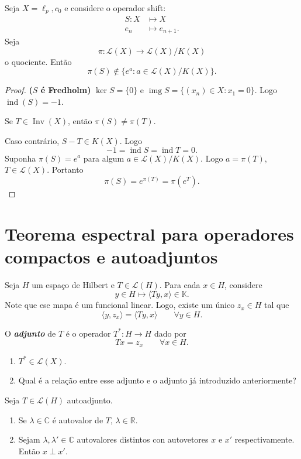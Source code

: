 \documentclass[portuguese]{article}
\theoremstyle{definition}
\newcommand{\R}{\mathbb{R}}
\newcommand{\C}{\mathbb{C}}
\DeclareMathOperator{\img}{img}
\begin{document}
\begin{coro}
	Seja $X=\ell_p,c_0$ e considere o operador shift:
	\begin{align*}
		S:X&\mapsto X\\
		e_n&\mapsto e_{n+1}.
	\end{align*}
	Seja
	\[\pi:\mathcal{L}(X)\to \mathcal{L}(X)/K(X)\]
	o quociente. Então
	\[\pi(S)\notin\{e^a:a\in\mathcal{L}(X)/K(X)\}.\]
\end{coro}
\begin{proof}
	\textbf{($S$ é Fredholm)} $\ker S=\{0\}$ e $\img S=\{(x_n)\in X:x_1=0\}$.
	Logo $\operatorname{ind}(S)=-1$.
	\begin{af}
		Se $T\in\operatorname{Inv}(X)$, então $\pi(S)\neq\pi(T)$.
	\end{af}
	Caso contrário, $S-T\in K(X)$. Logo
	\[-1=\operatorname{ind}S=\operatorname{ind}T=0.\]
	Suponha $\pi(S)=e^a$ para algum $a\in\mathcal{L}(X)/K(X)$. Logo $a=\pi(T)$, $T\in\mathcal{L}(X)$. Portanto
	\[\pi(S)=e^{\pi(T)}=\pi(e^T).\]
\end{proof}

\section{Teorema espectral para operadores compactos e autoadjuntos}
Seja $H$ um espaço de Hilbert e $T\in\mathcal{L}(H)$. Para cada $x\in H$, considere
\[y\in H\mapsto \langle Ty,x\rangle\in\mathbb{K}.\]
Note que ese mapa é um funcional linear. Logo, existe um único $z_x\in H$ tal que
\[\langle y,z_x\rangle=\langle Ty,x\rangle\qquad\forall y\in H.\]

\begin{defn}
	O \textbf{\textit{adjunto}} de $T$ é o operador $T^*:H\to H$ dado por
	\[Tx=z_x\qquad\forall x\in H.\]
\end{defn}
\begin{exer*}\leavevmode
	\begin{enumerate}
		\item $T^*\in\mathcal{L}(X)$.
		\item Qual é a relação entre esse adjunto e o adjunto já introduzido anteriormente?
	\end{enumerate}
\end{exer*}

\begin{prop}
	Seja $T\in\mathcal{L}(H)$ autoadjunto.
	\begin{enumerate}
		\item Se $\lambda\in\C$ é autovalor de $T$, $\lambda\in\R$.
		\item Sejam $\lambda, \lambda'\in\C$ autovalores distintos con autovetores $x$ e $x'$ respectivamente. Então $x\perp x'$.
	\end{enumerate}
\end{prop}
\end{document}
